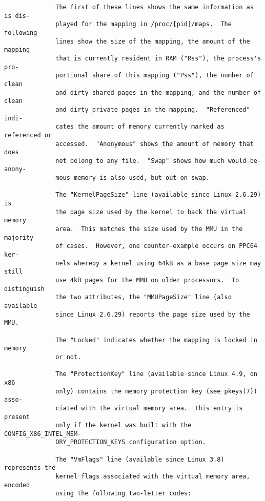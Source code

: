 \documentclass[]{article}
\begin{document}
\begin{verbatim}
              The first of these lines shows the same information as is dis‐
              played for the mapping in /proc/[pid]/maps.  The following
              lines show the size of the mapping, the amount of the mapping
              that is currently resident in RAM ("Rss"), the process's pro‐
              portional share of this mapping ("Pss"), the number of clean
              and dirty shared pages in the mapping, and the number of clean
              and dirty private pages in the mapping.  "Referenced" indi‐
              cates the amount of memory currently marked as referenced or
              accessed.  "Anonymous" shows the amount of memory that does
              not belong to any file.  "Swap" shows how much would-be-anony‐
              mous memory is also used, but out on swap.

              The "KernelPageSize" line (available since Linux 2.6.29) is
              the page size used by the kernel to back the virtual memory
              area.  This matches the size used by the MMU in the majority
              of cases.  However, one counter-example occurs on PPC64 ker‐
              nels whereby a kernel using 64kB as a base page size may still
              use 4kB pages for the MMU on older processors.  To distinguish
              the two attributes, the "MMUPageSize" line (also available
              since Linux 2.6.29) reports the page size used by the MMU.

              The "Locked" indicates whether the mapping is locked in memory
              or not.

              The "ProtectionKey" line (available since Linux 4.9, on x86
              only) contains the memory protection key (see pkeys(7)) asso‐
              ciated with the virtual memory area.  This entry is present
              only if the kernel was built with the CONFIG_X86_INTEL_MEM‐
              ORY_PROTECTION_KEYS configuration option.

              The "VmFlags" line (available since Linux 3.8) represents the
              kernel flags associated with the virtual memory area, encoded
              using the following two-letter codes:


\end{verbatim}
\end{document}
